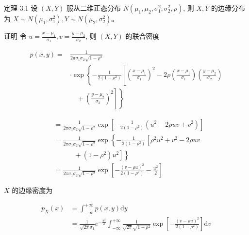 \documentclass{beamer}
\begin{document}
	\begin{frame}
		定理 3.1 设 $(X, Y)$ 服从二维正态分布 $N\left(\mu_{1}, \mu_{2}, \sigma_{1}^{2}, \sigma_{2}^{2}, \rho\right)$, 则 $X, Y$ 的边缘分布为 $X \sim N\left(\mu_{1}, \sigma_{1}^{2}\right), Y \sim N\left(\mu_{2}, \sigma_{2}^{2}\right) 。$
		
		\vspace*{1cm}
		证明 令 $u=\frac{x-\mu_{1}}{\sigma_{1}}, v=\frac{y-\mu_{2}}{\sigma_{2}}$, 则 $(X, Y)$ 的联合密度
		
		$$
		\begin{aligned}
			p(x, y)= & \frac{1}{2 \pi \sigma_{1} \sigma_{2} \sqrt{1-\rho^{2}}} \\
			& \cdot \exp \left\{-\frac{1}{2\left(1-\rho^{2}\right)}\left[\left(\frac{x-\mu_{1}}{\sigma_{1}}\right)^{2}-2 \rho\left(\frac{x-\mu_{1}}{\sigma_{1}}\right)\left(\frac{y-\mu_{2}}{\sigma_{2}}\right)\right.\right. \\
			&\quad + \left.\left.\left(\frac{y-\mu_{2}}{\sigma_{2}}\right)^{2}\right]\right\}
		\end{aligned}
		$$
	\end{frame}
	
	\begin{frame}
		$$
		\begin{aligned}
			& =\frac{1}{2 \pi \sigma_{1} \sigma_{2} \sqrt{1-\rho^{2}}} \exp \left[-\frac{1}{2\left(1-\rho^{2}\right)}\left(u^{2}-2 \rho u v+v^{2}\right)\right] \\
			& =\frac{1}{2 \pi \sigma_{1} \sigma_{2} \sqrt{1-\rho^{2}}} \exp \left\{-\frac{1}{2\left(1-\rho^{2}\right)}\left[\rho^{2} u^{2}+v^{2}-2 \rho u v
			\right.\right. \\
			& \quad\quad\quad +\left(1-\rho^{2}\right)
			\left.\left. u^{2}\right]\right\} \\
			& =\frac{1}{2 \pi \sigma_{1} \sigma_{2} \sqrt{1-\rho^{2}}} \exp \left[-\frac{(v-\rho u)^{2}}{2\left(1-\rho^{2}\right)}-\frac{u^{2}}{2}\right]
		\end{aligned}
		$$
		
		$X$ 的边缘密度为
		
		$$
		\begin{aligned}
			p_{X}(x) & =\int_{-\infty}^{+\infty} p(x, y) \mathrm{d} y \\
			& =\frac{1}{\sqrt{2 \pi} \sigma_{1}} e^{-\frac{u^{2}}{2}} \int_{-\infty}^{+\infty} \frac{1}{\sqrt{2 \pi} \sqrt{1-\rho^{2}}} \exp \left[-\frac{(v-\rho u)^{2}}{2\left(1-\rho^{2}\right)}\right] \mathrm{d} v
		\end{aligned}
		$$
	\end{frame}
	
\end{document}
